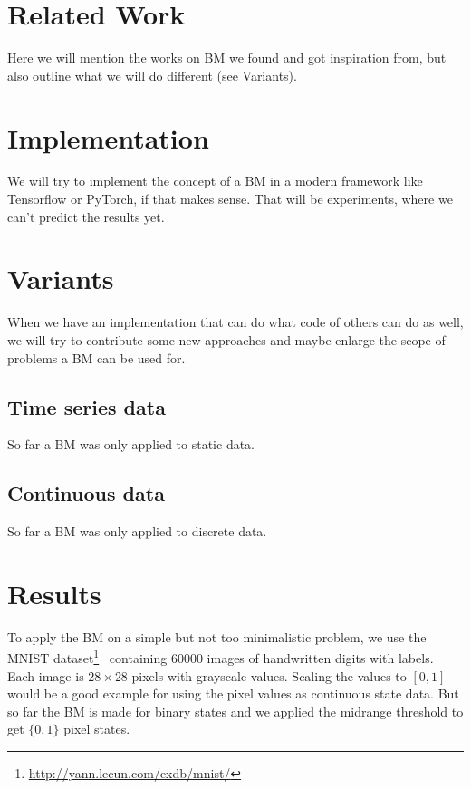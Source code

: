\documentclass[12pt,twoside]{article}
\theoremstyle{plain}
\theoremstyle{definition}
\theoremstyle{remark}
\begin{document}
\section{Related Work}
\label{sec:related}

Here we will mention the works on BM we found and got inspiration from, but also outline what we will do different (see Variants).


\section{Implementation}
\label{sec:impl}

We will try to implement the concept of a BM in a modern framework like Tensorflow or PyTorch, if that makes sense. That will be experiments, where we can't predict the results yet.


\section{Variants}
\label{sec:variants}

When we have an implementation that can do what code of others can do as well, we will try to contribute some new approaches and maybe enlarge the scope of problems a BM can be used for.


\subsection{Time series data}
\label{sec:variants:subsec:timeseries}

So far a BM was only applied to static data.


\subsection{Continuous data}
\label{sec:variants:subsec:continuous}

So far a BM was only applied to discrete data.


\section{Results}
\label{sec:results}

To apply the BM on a simple but not too minimalistic problem, we use the MNIST dataset\footnote{\url{http://yann.lecun.com/exdb/mnist/}}~\cite{MNIST} containing $60000$ images of handwritten digits with labels. Each image is $28 \times 28$ pixels with grayscale values. Scaling the values to $[0,1]$ would be a good example for using the pixel values as continuous state data. But so far the BM is made for binary states and we applied the midrange threshold to get $\{0, 1\}$ pixel states.
\end{document}
